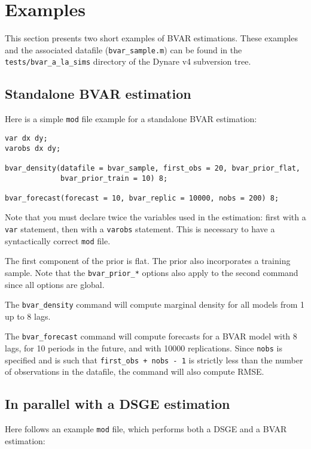\documentclass[10pt,a4paper]{article}
\begin{document}
\section{Examples}

This section presents two short examples of BVAR estimations. These examples and the associated datafile (\texttt{bvar\_sample.m}) can be found in the \texttt{tests/bvar\_a\_la\_sims} directory of the Dynare v4 subversion tree.

\subsection{Standalone BVAR estimation}

Here is a simple \texttt{mod} file example for a standalone BVAR estimation:

\begin{verbatim}
var dx dy;
varobs dx dy;

bvar_density(datafile = bvar_sample, first_obs = 20, bvar_prior_flat,
             bvar_prior_train = 10) 8;

bvar_forecast(forecast = 10, bvar_replic = 10000, nobs = 200) 8;
\end{verbatim}

Note that you must declare twice the variables used in the estimation: first with a \texttt{var} statement, then with a \texttt{varobs} statement. This is necessary to have a syntactically correct \texttt{mod} file.

The first component of the prior is flat. The prior also incorporates a training sample. Note that the \texttt{bvar\_prior\_*} options also apply to the second command since all options are global.

The \texttt{bvar\_density} command will compute marginal density for all models from 1 up to 8 lags.

The \texttt{bvar\_forecast} command will compute forecasts for a BVAR model with 8 lags, for 10 periods in the future, and with 10000 replications. Since \texttt{nobs} is specified and is such that \texttt{first\_obs + nobs - 1} is strictly less than the number of observations in the datafile, the command will also compute RMSE.

\subsection{In parallel with a DSGE estimation}

Here follows an example \texttt{mod} file, which performs both a DSGE and a BVAR estimation:
\end{document}
